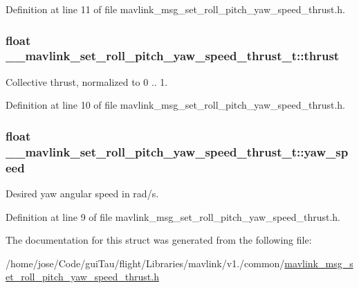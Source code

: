 Definition at line 11 of file mavlink\-\_\-msg\-\_\-set\-\_\-roll\-\_\-pitch\-\_\-yaw\-\_\-speed\-\_\-thrust.\-h.

\hypertarget{struct____mavlink__set__roll__pitch__yaw__speed__thrust__t_aded7b57218b5f75ac1247c3034bfd04f}{
\subsubsection[{thrust}]{\setlength{\rightskip}{0pt plus 5cm}float \-\_\-\-\_\-mavlink\-\_\-set\-\_\-roll\-\_\-pitch\-\_\-yaw\-\_\-speed\-\_\-thrust\-\_\-t\-::thrust}}\label{struct____mavlink__set__roll__pitch__yaw__speed__thrust__t_aded7b57218b5f75ac1247c3034bfd04f}


Collective thrust, normalized to 0 .. 1. 



Definition at line 10 of file mavlink\-\_\-msg\-\_\-set\-\_\-roll\-\_\-pitch\-\_\-yaw\-\_\-speed\-\_\-thrust.\-h.

\hypertarget{struct____mavlink__set__roll__pitch__yaw__speed__thrust__t_a1c7a83d7c5c3eed691a75f329fbde2f6}{
\subsubsection[{yaw\-\_\-speed}]{\setlength{\rightskip}{0pt plus 5cm}float \-\_\-\-\_\-mavlink\-\_\-set\-\_\-roll\-\_\-pitch\-\_\-yaw\-\_\-speed\-\_\-thrust\-\_\-t\-::yaw\-\_\-speed}}\label{struct____mavlink__set__roll__pitch__yaw__speed__thrust__t_a1c7a83d7c5c3eed691a75f329fbde2f6}


Desired yaw angular speed in rad/s. 



Definition at line 9 of file mavlink\-\_\-msg\-\_\-set\-\_\-roll\-\_\-pitch\-\_\-yaw\-\_\-speed\-\_\-thrust.\-h.



The documentation for this struct was generated from the following file\-:\begin{DoxyCompactItemize}
\item 
/home/jose/\-Code/gui\-Tau/flight/\-Libraries/mavlink/v1./common/\hyperlink{mavlink__msg__set__roll__pitch__yaw__speed__thrust_8h}{mavlink\-\_\-msg\-\_\-set\-\_\-roll\-\_\-pitch\-\_\-yaw\-\_\-speed\-\_\-thrust.\-h}\end{DoxyCompactItemize}
